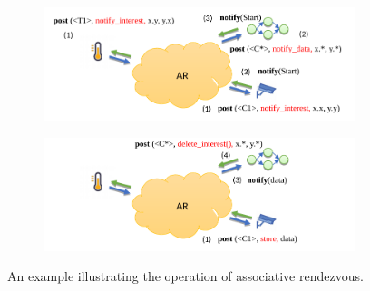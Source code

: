 \begin{figure}[h]
\centering
\begin{subfigure}[b]{0.8\textwidth}
   \includegraphics[width=1.1\linewidth]{Figures/AR_Exmple_1.pdf}
   \caption{}
\end{subfigure}
\begin{subfigure}[b]{0.8\textwidth}
   \includegraphics[width=1.1\linewidth]{Figures/AR_Example_2.pdf}
   \caption{}\label{fig:ARExample2} 
\end{subfigure}
\caption{An example illustrating the operation of associative rendezvous.}\label{fig:ARExample} 
\end{figure}

